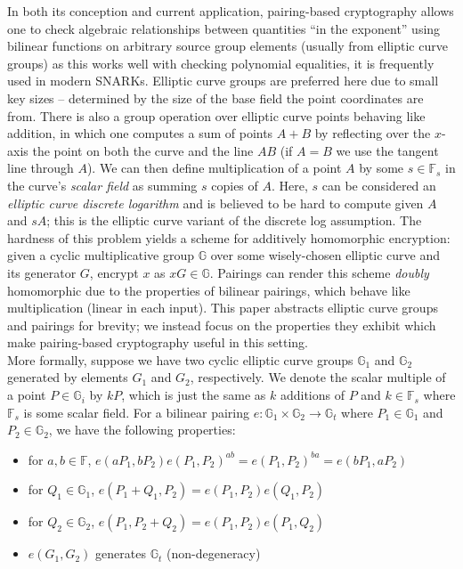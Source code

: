 \noindent In both its conception and current application, pairing-based cryptography \cite{ibepairings} allows one to check algebraic relationships between quantities ``in the exponent'' using bilinear functions on arbitrary source group elements (usually from elliptic curve groups) as this works well with checking polynomial equalities, it is frequently used in modern SNARKs. Elliptic curve groups are preferred here due to small key sizes -- determined by the size of the base field the point coordinates are from. There is also a group operation over elliptic curve points behaving like addition, in which one computes a sum of points $A + B$ by reflecting over the $x$-axis the point on both the curve and the line $AB$ (if $A = B$ we use the tangent line through $A$). We can then define multiplication of a point $A$ by some $s \in \mathbb{F}_s$ in the curve's \textit{scalar field} as summing $s$ copies of $A$. Here, $s$ can be considered an \textit{elliptic curve discrete logarithm} and is believed to be hard to compute given $A$ and $sA$; this is the elliptic curve variant of the discrete log assumption. The hardness of this problem yields a scheme for additively homomorphic encryption: given a cyclic multiplicative group $\mathbb{G}$ over some wisely-chosen elliptic curve and its generator $G$, encrypt $x$ as $xG \in \mathbb{G}$. Pairings can render this scheme \textit{doubly} homomorphic due to the properties of bilinear pairings, which behave like multiplication (linear in each input). This paper abstracts elliptic curve groups and pairings for brevity; we instead focus on the properties they exhibit which make pairing-based cryptography useful in this setting.\\

\noindent More formally, suppose we have two cyclic elliptic curve groups $\mathbb{G}_1$ and $\mathbb{G}_2$ generated by elements $G_1$ and $G_2$, respectively. We denote the scalar multiple of a point $P \in \mathbb{G}_i$ by $kP$, which is just the same as $k$ additions of $P$ and $k \in \mathbb{F}_s$ where $\mathbb{F}_s$ is some scalar field. For a bilinear pairing $e: \mathbb{G}_1 \times \mathbb{G}_2 \to \mathbb{G}_t$ where $P_1 \in \mathbb{G}_1$ and $P_2 \in \mathbb{G}_2$, we have the following properties:
\begin{itemize}
    \item for $a, b \in \mathbb{F}$, $e(aP_1, bP_2) e(P_1, P_2)^{ab} = e(P_1, P_2)^{ba} = e(bP_1, aP_2)$
    \item for $Q_1 \in \mathbb{G}_1$, $e(P_1+Q_1, P_2) = e(P_1, P_2) e(Q_1, P_2)$
    \item for $Q_2 \in \mathbb{G}_2$, $e(P_1, P_2+Q_2) = e(P_1, P_2) e(P_1, Q_2)$
    \item $e(G_1, G_2)$ generates $\mathbb{G}_t$ (non-degeneracy)
\end{itemize}

